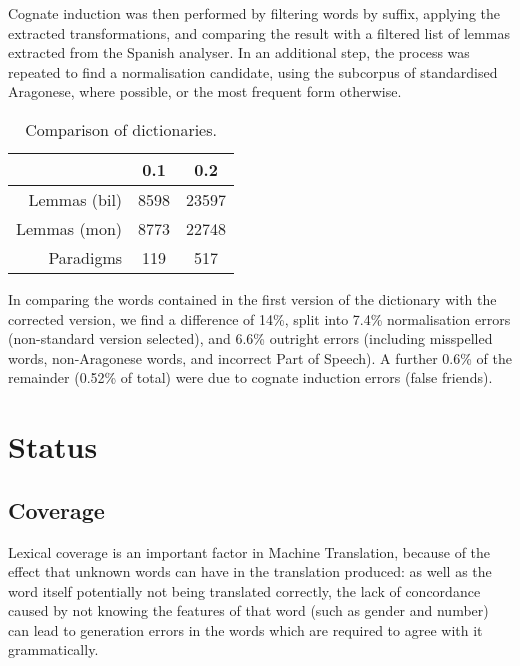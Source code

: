 \documentclass[10pt, a4paper]{article}
\begin{document}
  Cognate induction was then performed by filtering words by suffix, applying the extracted transformations, and comparing the result with a filtered list of lemmas extracted from the Spanish analyser. In an additional step, the process was repeated to find a normalisation candidate, using the subcorpus of standardised Aragonese, where possible, or the most frequent form otherwise.
  
  \begin{table}
  \begin{center}
  \caption{Comparison of dictionaries.\label{tab:phases}}
  \begin{tabular}{|r|c|c|}
  \hline
    & 0.1 & 0.2 \\
  \hline
  Lemmas (bil) & 8598  & 23597 \\
  \hline
  Lemmas (mon) & 8773  & 22748\\
  Paradigms    & 119   & 517  \\
  \hline
  \end{tabular}
  \end{center}
  \end{table}
  
  In comparing the words contained in the first version of the dictionary with the corrected version, we find a difference of 14\%, split into 7.4\% normalisation errors (non-standard version selected), and 6.6\% outright errors (including misspelled words, non-Aragonese words, and incorrect Part of Speech). A further 0.6\% of the remainder (0.52\% of total) were due to cognate induction errors (false friends).
  
  \section{Status}
  
  \subsection{Coverage}
  
  Lexical coverage is an important factor in Machine Translation, because of the effect that unknown words can have in the translation produced: as well as the word itself potentially not being translated correctly, the lack of concordance caused by not knowing the features of that word (such as gender and number) can lead to generation errors in the words which are required to agree with it grammatically.
  
\end{document}
